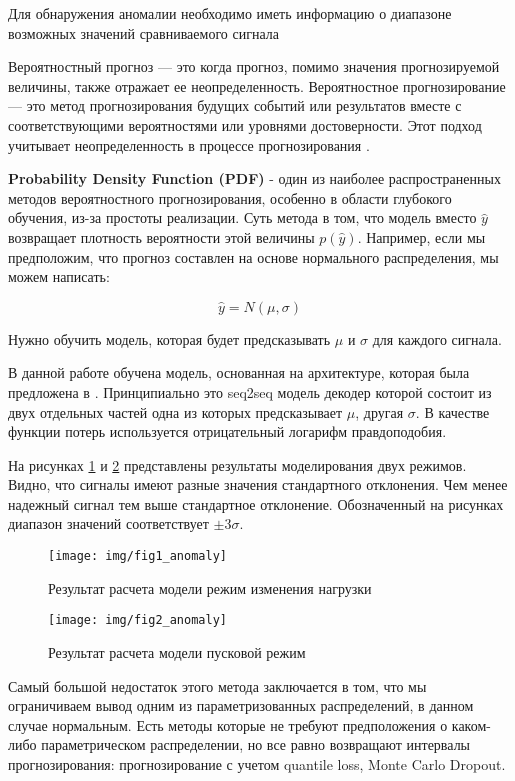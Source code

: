 \documentclass[12pt,a4paper]{article}
\begin{document}
Для обнаружения аномалии необходимо иметь информацию о диапазоне возможных значений сравниваемого сигнала
 
Вероятностный прогноз — это когда прогноз, помимо значения прогнозируемой величины, также отражает ее неопределенность. Вероятностное прогнозирование — это метод прогнозирования будущих событий или результатов вместе с соответствующими вероятностями или уровнями достоверности. Этот подход учитывает неопределенность в процессе прогнозирования \cite{joseph_tackes}.

\textbf{Probability Density Function (PDF)} - один из наиболее распространенных методов вероятностного прогнозирования, особенно в области глубокого обучения, из-за простоты реализации. Суть метода в том, что модель вместо $\hat{y}$ возвращает плотность вероятности этой величины $p(\hat{y})$. Например, если мы предположим, что прогноз составлен на основе нормального распределения, мы можем написать:

$$\hat{y} = N(\mu, \sigma)$$

Нужно обучить модель, которая будет предсказывать $\mu$ и $\sigma$ для каждого сигнала.

В данной работе обучена модель, основанная на архитектуре, которая была предложена в \cite{wang_smola}. Принципиально это seq2seq модель декодер которой состоит из двух отдельных частей одна из которых предсказывает $\mu$, другая $\sigma$. В качестве функции потерь используется отрицательный логарифм правдоподобия.
 
На рисунках \ref{fig:fig1_anomaly} и \ref{fig:fig2_anomaly} представлены результаты моделирования двух режимов. Видно, что сигналы имеют разные значения стандартного отклонения.  Чем менее надежный сигнал тем выше стандартное отклонение. Обозначенный на рисунках диапазон значений соответствует $\pm3\sigma$.
 
 \begin{figure}[htbp]
 	\centering\texttt{[image: img/fig1\_anomaly]}
 	\caption{Результат расчета модели режим изменения нагрузки}
 	\label{fig:fig1_anomaly}
 \end{figure}
 
 \begin{figure}[htbp]
 	\centering\texttt{[image: img/fig2\_anomaly]}
 	\caption{Результат расчета модели пусковой режим}
 	\label{fig:fig2_anomaly}
 \end{figure}
 
Самый большой недостаток этого метода заключается в том, что мы ограничиваем вывод одним из параметризованных распределений, в данном случае нормальным. Есть методы которые не требуют предположения о каком-либо параметрическом распределении, но все равно возвращают интервалы прогнозирования: прогнозирование с учетом quantile loss, Monte Carlo Dropout.
\end{document}

